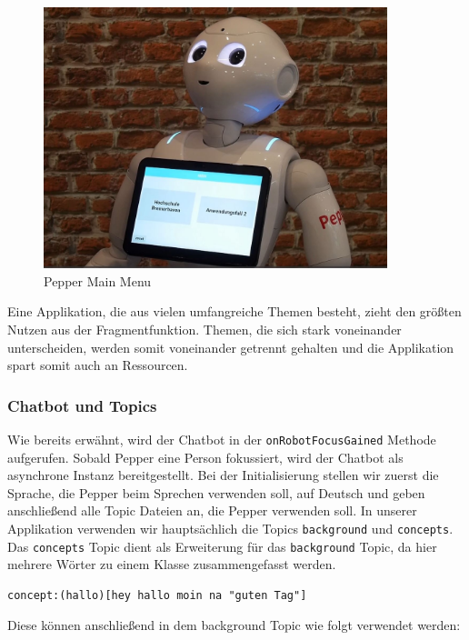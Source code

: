 \begin{figure}[H]
    \centering
    \includegraphics[width=10cm]{Figures/AppChapter/rx1.JPG}
    \caption{Pepper Main Menu}
    \label{fig:Mainmenu}
    \centering
\end{figure}

Eine Applikation, die aus vielen umfangreiche Themen besteht, zieht den größten Nutzen aus der Fragmentfunktion. Themen, die sich stark voneinander unterscheiden, werden somit voneinander getrennt gehalten und die Applikation spart somit auch an Ressourcen.\\

\subsubsection{Chatbot und Topics}

Wie bereits erwähnt, wird der Chatbot in der \verb|onRobotFocusGained| Methode aufgerufen. Sobald Pepper eine Person fokussiert, wird der Chatbot als asynchrone Instanz bereitgestellt. Bei der Initialisierung stellen wir zuerst die Sprache, die Pepper beim Sprechen verwenden soll, auf Deutsch und geben anschließend alle Topic Dateien an, die Pepper verwenden soll. In unserer Applikation verwenden wir hauptsächlich die Topics \verb|background| und \verb|concepts|. Das \verb|concepts| Topic dient als Erweiterung für das \verb|background| Topic, da hier mehrere Wörter zu einem Klasse zusammengefasst werden.\\

\begin{lstlisting}
concept:(hallo)[hey hallo moin na "guten Tag"]
\end{lstlisting}

Diese können anschließend in dem background Topic wie folgt verwendet werden:\\

